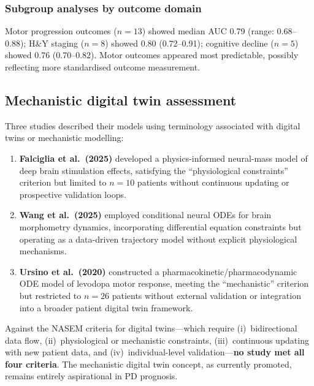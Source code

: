 \documentclass[11pt,a4paper]{article}
\begin{document}
\subsubsection{Subgroup analyses by outcome domain}
Motor progression outcomes ($n=13$) showed median AUC 0.79 (range: 0.68--0.88); H\&Y staging ($n=8$) showed 0.80 (0.72--0.91); cognitive decline ($n=5$) showed 0.76 (0.70--0.82). Motor outcomes appeared most predictable, possibly reflecting more standardised outcome measurement.

\subsection{Mechanistic digital twin assessment}
\label{sec:dt}

Three studies described their models using terminology associated with digital twins or mechanistic modelling:

\begin{enumerate}[leftmargin=*]
    \item \textbf{Falciglia et al.\ (2025)} developed a physics-informed neural-mass model of deep brain stimulation effects, satisfying the ``physiological constraints'' criterion but limited to $n=10$ patients without continuous updating or prospective validation loops.
    \item \textbf{Wang et al.\ (2025)} employed conditional neural ODEs for brain morphometry dynamics, incorporating differential equation constraints but operating as a data-driven trajectory model without explicit physiological mechanisms.
    \item \textbf{Ursino et al.\ (2020)} constructed a pharmacokinetic/pharmacodynamic ODE model of levodopa motor response, meeting the ``mechanistic'' criterion but restricted to $n=26$ patients without external validation or integration into a broader patient digital twin framework.
\end{enumerate}

Against the NASEM criteria for digital twins---which require (i)~bidirectional data flow, (ii)~physiological or mechanistic constraints, (iii)~continuous updating with new patient data, and (iv)~individual-level validation---\textbf{no study met all four criteria}. The mechanistic digital twin concept, as currently promoted, remains entirely aspirational in PD prognosis.

\end{document}
